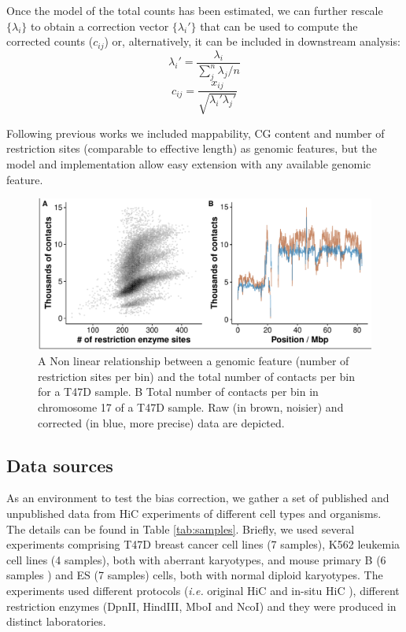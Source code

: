\documentclass{bioinfo}
\begin{document}
\begin{methods}
Once the model of the total counts has been estimated, we can further rescale  $\{\lambda_i\}$ to obtain a correction vector $\{\lambda_i'\}$ that can be used to compute the corrected counts ($c_{ij}$) or, alternatively, it can be included in downstream analysis:
$$
\lambda_i' = \frac{\lambda_i}{\sum_j^n{\lambda_j}/n}
$$
$$
c_{ij} = \frac{x_{ij}}{\sqrt{\lambda_i'\lambda_j'}}
$$

Following  previous works \citep{yaffe2011probabilistic,hu2012hicnorm} we included mappability, CG content and number of restriction sites (comparable to effective length) as genomic features, but the model and implementation allow easy extension with any available genomic feature.

\begin{figure}[!tpb]
	\centerline{\includegraphics[width=.45\textwidth]{img/figure1.pdf}}
	\caption{
		A Non linear relationship between a genomic feature (number of restriction sites per bin) and the total number of contacts per bin for a T47D sample. B Total number of contacts per bin in chromosome 17 of a T47D sample. Raw (in brown, noisier) and corrected (in blue, more precise) data are depicted.
	}\label{fig:totals}
\end{figure}

\subsection{Data sources}

As an environment to test the bias correction, we gather a set of published \citep{ledily2014distinct,encode2012integrated,rao20143d,stadhouders2017transcription,lin2012global,dixon2012topological} and unpublished data from HiC experiments of different cell types and organisms. The details can be found in Table \ref{tab:samples}. Briefly, we used several experiments comprising T47D breast cancer cell lines (7 samples), K562 leukemia cell lines (4 samples), both with aberrant karyotypes, and mouse primary B (6 samples ) and ES (7 samples) cells, both with normal diploid karyotypes. The experiments used different protocols (\textit{i.e.} original HiC \citep{lieberman2009comprehensive} and in-situ HiC \citep{rao20143d}), different restriction enzymes (DpnII, HindIII, MboI and NcoI) and they were produced in distinct laboratories.


\end{methods}
\end{document}
